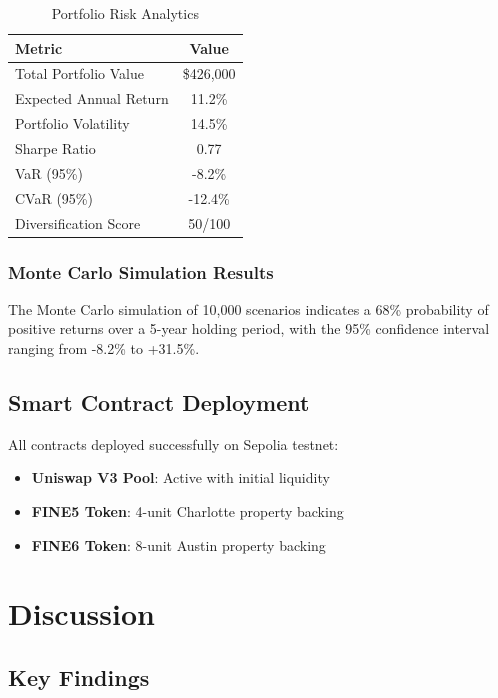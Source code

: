 ﻿\documentclass[12pt]{article}
\begin{document}
\begin{table}[H]
\centering
\caption{Portfolio Risk Analytics}
\label{tab:portfolio}
\begin{tabular}{@{}lc@{}}
\toprule
\textbf{Metric} & \textbf{Value} \\
\midrule
Total Portfolio Value & \$426,000 \\
Expected Annual Return & 11.2\% \\
Portfolio Volatility & 14.5\% \\
Sharpe Ratio & 0.77 \\
VaR (95\%) & -8.2\% \\
CVaR (95\%) & -12.4\% \\
Diversification Score & 50/100 \\
\bottomrule
\end{tabular}
\end{table}

\subsubsection{Monte Carlo Simulation Results}

The Monte Carlo simulation of 10,000 scenarios indicates a 68\% probability of positive returns over a 5-year holding period, with the 95\% confidence interval ranging from -8.2\% to +31.5\%.

\subsection{Smart Contract Deployment}

All contracts deployed successfully on Sepolia testnet:
\begin{itemize}
    \item \textbf{Uniswap V3 Pool}: Active with initial liquidity
    \item \textbf{FINE5 Token}: 4-unit Charlotte property backing
    \item \textbf{FINE6 Token}: 8-unit Austin property backing
\end{itemize}

\section{Discussion}

\subsection{Key Findings}
\end{document}
